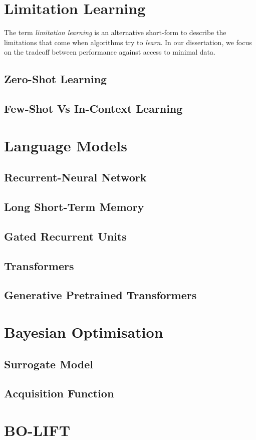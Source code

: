 \documentclass{report}
\begin{document}
\section{Limitation Learning}
The term \textit{limitation learning} is an alternative short-form to describe the limitations that come when algorithms try to \textit{learn}. In our dissertation, we focus on the tradeoff between performance against access to minimal data.
\subsection{Zero-Shot Learning}
\subsection{Few-Shot Vs In-Context Learning}
\section{Language Models}
\subsection{Recurrent-Neural Network}
\subsection{Long Short-Term Memory}
\subsection{Gated Recurrent Units}
\subsection{Transformers}
\subsection{Generative Pretrained Transformers}
\section{Bayesian Optimisation}
\subsection{Surrogate Model}
\subsection{Acquisition Function}
\section{BO-LIFT}
\end{document}
